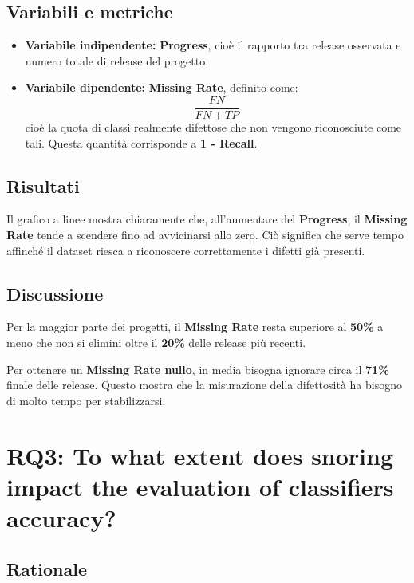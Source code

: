 \subsection{Variabili e metriche}

\begin{itemize}
    \item \textbf{Variabile indipendente:} \textbf{Progress}, cioè il rapporto tra release osservata e numero totale di release del progetto.
    \item \textbf{Variabile dipendente:} \textbf{Missing Rate}, definito come:
    \[
        \frac{FN}{FN + TP}
    \]
    cioè la quota di classi realmente difettose che non vengono riconosciute come tali. Questa quantità corrisponde a \textbf{1 - Recall}.
\end{itemize}

\subsection{Risultati}

Il grafico a linee mostra chiaramente che, all'aumentare del \textbf{Progress}, il \textbf{Missing Rate} tende a scendere fino ad avvicinarsi allo zero. Ciò significa che serve tempo affinché il dataset riesca a riconoscere correttamente i difetti già presenti.

\subsection{Discussione}

Per la maggior parte dei progetti, il \textbf{Missing Rate} resta superiore al \textbf{50\%} a meno che non si elimini oltre il \textbf{20\%} delle release più recenti.

\begin{notaprof}
Per ottenere un \textbf{Missing Rate nullo}, in media bisogna ignorare circa il \textbf{71\%} finale delle release. Questo mostra che la misurazione della difettosità ha bisogno di molto tempo per stabilizzarsi.
\end{notaprof}

\section{RQ3: To what extent does snoring impact the evaluation of classifiers accuracy?}

\subsection{Rationale}

